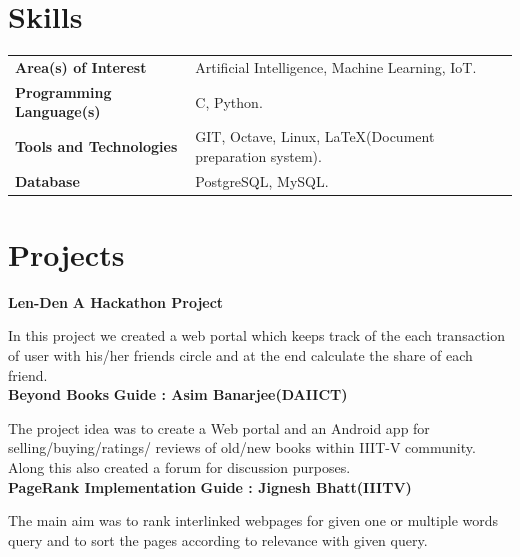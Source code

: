 \documentclass{article}
\begin{document}
\vspace*{.4cm}
\section{Skills}
\vspace*{2mm}
\begin{tabular}{ll}
\textbf{Area(s) of Interest} & Artificial Intelligence, Machine Learning, IoT.\\
\textbf{Programming Language(s)}&C, Python.\\
\textbf{Tools and Technologies} & GIT, Octave, Linux, \LaTeX(Document preparation system).\\
\textbf{Database} & PostgreSQL, MySQL.\\
\end{tabular}

\vspace*{.5cm}
\section{Projects}
\vspace*{2mm}
\textbf{\large{Len-Den}} \hspace*{13cm} \textbf{A Hackathon Project}

\vspace*{.031mm}
\hspace*{2.6mm}
In this project we created a web portal which keeps track of the each transaction of user with his/her friends circle and at the end calculate the share of each friend.\\

\vspace*{2mm}
\textbf{\large{Beyond Books}} \hspace*{9.5cm} \textbf{Guide : Asim Banarjee(DAIICT)}

\vspace*{.031mm}
\hspace*{2.6mm} The project idea was to create a Web portal and an Android app for selling/buying/ratings/ reviews of old/new books within IIIT-V community. Along this also created a forum for discussion purposes.\\

\vspace*{2mm}
\textbf{\large{PageRank Implementation}} \hspace*{7.8cm} \textbf{Guide : Jignesh Bhatt(IIITV)}

\vspace*{.031mm}
\hspace*{2.6mm} The main aim was to rank interlinked webpages for given one or multiple words query and to sort the pages according to relevance with given query.\\%
\end{document}
